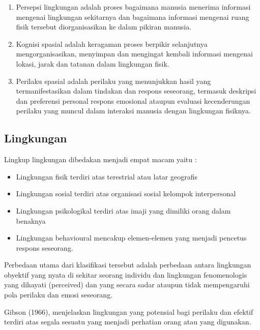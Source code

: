 \documentclass[../manperil.tex]{subfiles}
\begin{document}
\begin{enumerate}
	\item Persepsi lingkungan adalah proses bagaimana manusia menerima informasi mengenai lingkungan sekitarnya dan bagaimana informasi mengenai ruang fisik tersebut diorganisasikan ke dalam pikiran manusia.
	\item Kognisi spasial adalah keragaman proses berpikir selanjutnya mengorganisasikan, menyimpan dan mengingat kembali informasi mengenai lokasi, jarak dan tatanan dalam lingkungan fisik.
	\item Perilaku spasial adalah perilaku yang menunjukkan hasil yang termanifestasikan dalam tindakan dan respons seseorang, termasuk deskripsi dan preferensi personal respons emosional ataupun evaluasi kecenderungan perilaku yang muncul dalam interaksi manusia dengan lingkungan fisiknya.
\end{enumerate}

\subsection{Lingkungan}%
\label{sub:lingkungan}

Lingkup lingkungan dibedakan menjadi empat macam yaitu :
\begin{itemize}
	\item Lingkungan fisik terdiri atas terestrial atau latar geografis
	\item Lingkungan sosial terdiri atas organisasi sosial kelompok interpersonal
	\item Lingkungan psikologikal terdiri atas imaji yang dimiliki orang dalam benaknya
	\item Lingkungan behavioural mencakup elemen-elemen yang menjadi pencetus respons seseorang.
\end{itemize}

Perbedaan utama dari klasifikasi tersebut adalah perbedaan antara lingkungan obyektif yang nyata di sekitar seorang individu dan lingkungan fenomenologis yang dihayati (perceived) dan yang secara sadar ataupun tidak mempengaruhi pola perilaku dan emosi seseorang.

Gibson (1966), menjelaskan lingkungan yang potensial bagi perilaku dan efektif terdiri atas segala sesuatu yang menjadi perhatian orang atau yang digunakan.
\end{document}
